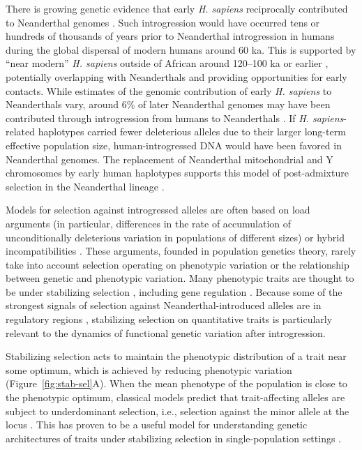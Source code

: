 \documentclass{article}
\begin{document}
There is growing genetic evidence that early \emph{H. sapiens} reciprocally
contributed to Neanderthal genomes \citep{kuhlwilm2016ancient,
hubisz2020mapping, harris2023diverse}. Such introgression would have occurred
tens or hundreds of thousands of years prior to Neanderthal introgression in
humans during the global dispersal of modern humans around 60 ka. This is
supported by ``near modern'' \emph{H. sapiens} outside of African around
120--100 ka or earlier \citep{schwarcz1988esr, grun2005u, beyer2021climatic},
potentially overlapping with Neanderthals and providing opportunities for early
contacts. While estimates of the genomic contribution of early \emph{H.
sapiens} to Neanderthals vary, around $6\%$ of later Neanderthal genomes may
have been contributed through introgression from humans to Neanderthals
\citep{harris2023diverse}. If \emph{H. sapiens}-related haplotypes carried
fewer deleterious alleles due to their larger long-term effective population
size, human-introgressed DNA would have been favored in Neanderthal genomes.
The replacement of Neanderthal mitochondrial and Y chromosomes by early human
haplotypes supports this model of post-admixture selection in the Neanderthal
lineage \citep{posth2017deeply, petr2020evolutionary}.

Models for selection against introgressed alleles are often based on load
arguments (in particular, differences in the rate of accumulation of
unconditionally deleterious variation in populations of different sizes) or
hybrid incompatibilities \citep{muller1942isolating}. These arguments, founded
in population genetics theory, rarely take into account selection operating on
phenotypic variation or the relationship between genetic and phenotypic
variation. Many phenotypic traits are thought to be under stabilizing selection
\citep{sanjak2018evidence, sella2019thinking}, including gene regulation
\citep{gilad2006natural, hodgins2015gene, price2022detecting}. Because some of
the strongest signals of selection against Neanderthal-introduced alleles are
in regulatory regions \citep{sankararaman2014genomic}, stabilizing selection on
quantitative traits is particularly relevant to the dynamics of functional
genetic variation after introgression.

Stabilizing selection acts to maintain the phenotypic distribution of a trait
near some optimum, which is achieved by reducing phenotypic variation
(Figure~\ref{fig:stab-sel}A). When the mean phenotype of the population is
close to the phenotypic optimum, classical models predict that trait-affecting
alleles are subject to underdominant selection, i.e., selection against the
minor allele at the locus \citep{robertson1956effect}. This has proven to be a
useful model for understanding genetic architectures of traits under
stabilizing selection in single-population settings
\citep[e.g.,][]{keightley1988quantitative, simons2018population,
hayward2022polygenic}.
\end{document}
